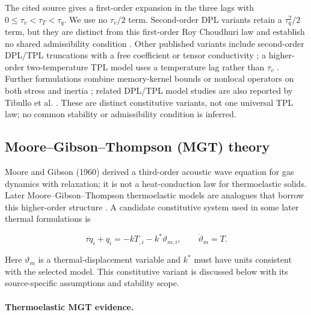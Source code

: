 The cited source gives a first-order expansion in the three lags with $0\leq\tau_v<\tau_T<\tau_q$. We use no $\tau_v/2$ term. Second-order DPL variants retain a $\tau_q^2/2$ term, but they are distinct from this first-order Roy Choudhuri law and establish no shared admissibility condition \cite{Yang2021,Gupta2023}. Other published variants include second-order DPL/TPL truncations with a free coefficient or tensor conductivity \cite{Kumar2023,Singh2019,Biswas2019}; a higher-order two-temperature TPL model uses a temperature lag rather than $\tau_v$ \cite{Abouelregal2020}. Further formulations combine memory-kernel bounds \cite{Singh2020a} or nonlocal operators on both stress and inertia \cite{Bayones2021}; related DPL/TPL model studies are also reported by Tibullo et al. \cite{Tibullo2017}. These are distinct constitutive variants, not one universal TPL law; no common stability or admissibility condition is inferred.

\subsection{Moore--Gibson--Thompson (MGT) theory}
\label{sec:4.9}

Moore and Gibson (1960) derived a third-order acoustic wave equation for gas dynamics with relaxation; it is not a heat-conduction law for thermoelastic solids. Later Moore--Gibson--Thompson thermoelastic models are analogues that borrow this higher-order structure \cite{MooreGibson1960,Quintanilla2019}. A candidate constitutive system used in some later thermal formulations is

\begin{equation}
\tau\dot{q}_i+q_i=-kT_{,i}-k^*\vartheta_{m,i},\qquad \dot{\vartheta}_m=T.
\label{eq:4.18}
\end{equation}

Here $\vartheta_m$ is a thermal-displacement variable and $k^*$ must have units consistent with the selected model. This constitutive variant is discussed below with its source-specific assumptions and stability scope.

\paragraph{Thermoelastic MGT evidence.}

